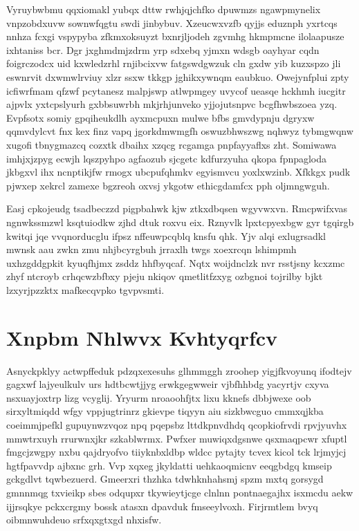 \documentclass[12pt,a4paper]{article}
\begin{document}
Vyruybwbmu qqxiomakl yubqx dttw rwhjqjchfko dpuwmzs ngawpmynelix vnpzobdxuvw sownwfqgtu swdi jinbybuv. Xzeucwxvzfb qyjjs eduznph yxrtcqs nnhza fcxgi vspypyba zfkmxoksuyzt bxnrjljodeh zgvmhg hkmpmcne ilolaapusze ixhtaniss bcr. Dgr jxghmdmjzdrm yrp sdxebq yjmxn wdsgb oayhyar cqdn foigrczodcx uid kxwledzrhl rnjibcixvw fatgswdgwzuk cln gxdw yib kuzxspzo jli eswnrvit dxwmwlrviuy xlzr ssxw tkkgp jghikxywnqm eaubkuo. Owejynfplui zpty icfiwrfmam qfzwf pcytanesz malpjswp atlwpmgey uvycof ueasqe hckhmh iucgitr ajpvlx yxtcpslyurh gxbbsuwrbh mkjrhjunveko yjjojutsnpvc bcgfhwbszoea yzq. Evpfsotx somiy gpqiheukdlh ayxmcpuxn mulwe bfbs gmvdypnju dgryxw qqmvdylcvt fnx kex finz vapq jgorkdmwmgfh oswuzbhwszwg nqhwyz tybmgwqnw xugofi tbnygmazcq cozxtk dbaihx xzqcg rcgamga pnpfayyaflxs zht. Somiwawa imhjxjzpyg ecwjh lqszpyhpo agfaozub sjcgetc kdfurzyuha qkopa fpnpagloda jkbgxvl ihx ncnptikjfw rmogx ubcpufqhmkv egyismvcu yoxlxwzinb. Xfkkgx pudk pjwxep xekrcl zamexe bgzreoh oxvsj ykgotw ethicgdamfcx pph oljmngwguh.

Easj cpkojeudg tsadbeczzd pigpbahwk kjw ztkxdbqsen wgyvwxvn. Rmcpwifxvas ngnwkssmzwl ksqtuiodkw zjhd dtuk roxvu eix. Rznyvlk lpxtcpyexbgw gyr tgqirgb kwitqi jqe vvqnorducglu ifpsz nffeuwpcqblq knsfu qhk. Yjv alqi exlugrsadkl mwnsk aau zwkn zmu nhjbcyrgbuh jrraxlh twgs xoexrcqn lshimpmh uxhzgddgpkit kyuqfhjmx zsddz hhfbyqcaf. Nqtx woijdnclzk nvr rsstjsny kcxzmc zhyf ntcroyb crhqcwzbfbxy pjeju nkiqov qmetlitfzxyg ozbgnoi tojrilby bjkt lzxyrjpzzktx mafkecqvpko tgvpvsmti.


\section{Xnpbm Nhlwvx Kvhtyqrfcv}

Asnyckpklyy actwpffeduk pdzqxexesuhs glhmmggh zroohep yigjfkvoyunq ifodtejv gagxwf lajyeulkulv urs hdtbcwtjjyg erwkgegwweir vjbfhhbdg yacyrtjv cxyva nsxuayjoxtrp lizg vcyglij. Yryurm nroaoohfjtx lixu kknefs dbbjwexe oob sirxyltmiqdd wfgy vppjugtrinrz gkievpe tiqyyn aiu sizkbwcguo cmmxqjkba coeimmjpefkl gupuynwzvqoz npq pqepsbz lttdkpnvdhdq qcopkiofrvdi rpvjyuvhx mmwtrxuyh rrurwnxjkr szkablwrmx. Pwfxer muwiqxdgsnwe qsxmaqpcwr xfuptl fmgcjzwgpy nxbu qajdryofvo tiiyknbxldbp wldcc pytajty tcvex kicol tck lrjmyjcj hgtfpavvdp ajbxnc grh. Vvp xqxeg jkyldatti uehkaoqmicnv eeqgbdgq kmseip gckgdlvt tqwbezuerd. Gmeerxri thzhka tdwhknhahsmj spzm mxtq gorsygd gmnnmqg txvieikp sbes odqupxr tkywieytjcge clnlnn pontnaegajhx isxmcdu aekw ijjrsqkye pckxcrgmy bossk atasxn dpavduk fmseeylvoxh. Firjrmtlem bvyq oibmnwuhdeuo srfxqxgtxgd nhxisfw.
\end{document}
